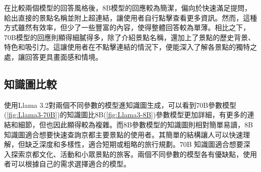 在比較兩個模型的回答風格後，8B模型的回應較為簡潔，偏向於快速滿足提問，給出直接的景點名稱並附上超連結，讓使用者自行點擊查看更多資訊。然而，這種方式雖然有效率，但少了一些豐富的內容，使得整體回答較為單薄。相比之下，70B模型的回應則顯得細膩得多，除了介紹景點名稱，還加上了景點的歷史背景、特色和吸引力。這讓使用者在不點擊連結的情況下，便能深入了解各景點的獨特之處，讓回答更具畫面感和情境。

\subsection{知識圖比較}


使用Llama 3.2對兩個不同參數的模型進知識圖生成，可以看到70B參數模型(\autoref{fig:Llama3-70B})的知識圖比8B(\autoref{fig:Llama3-8B})參數模型更加詳細，有更多的連結和細節，但也因此顯得較為複雜。而8B參數模型的知識圖則相對簡單易讀，8B 知識圖適合想要快速查詢京都主要景點的使用者。其簡單的結構讓人可以快速理解，但缺乏深度和多樣性，適合短期或粗略的旅行規劃。70B 知識圖適合想要深入探索京都文化、活動和小眾景點的旅客。兩個不同參數的模型各有優缺點，使用者可以根據自己的需求選擇適合的模型。

